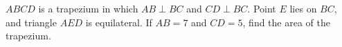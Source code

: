 $ABCD$ is a trapezium in which $AB\perp BC$ and $CD\perp BC$. Point $E$ lies on $BC$, and triangle $AED$ is equilateral. If $AB=7$ and $CD=5$, find the area of the trapezium.
